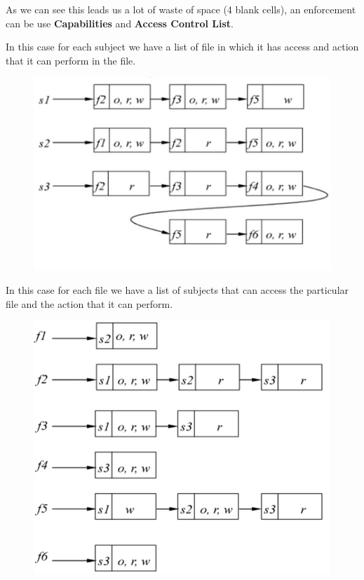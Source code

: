 \FloatBarrier

As we can see this leads us a lot of waste of space (4 blank cells), an enforcement can be use \textbf{Capabilities} and \textbf{Access Control List}.

In this case for each subject we have a list of file in which it has access and action that it can perform in the file.
\begin{figure}[h!]
    \centering
    \includegraphics[scale=0.4]{images/capabilities.png}
\end{figure}

\FloatBarrier

In this case for each file we have a list of subjects that can access the particular file and the action that it can perform.

\begin{figure}[h!]
    \centering
    \includegraphics[scale=0.4]{images/ACL.png}
\end{figure}

